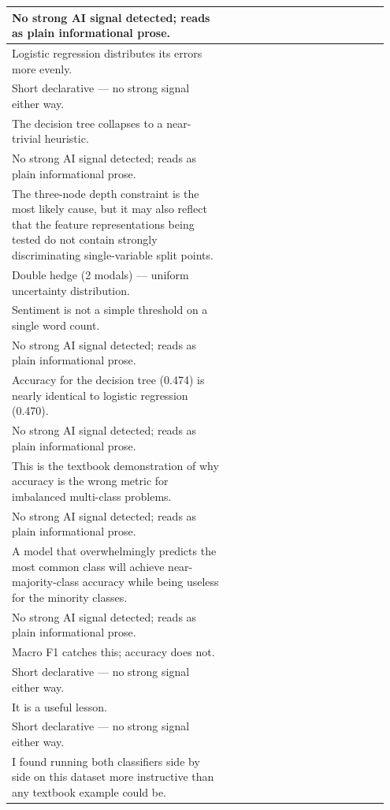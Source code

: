 \documentclass[11pt]{article}
\begin{document}
\begin{longtable}{|p{0.55\linewidth}|p{0.40\linewidth}|}
\hline
No strong AI signal detected; reads as plain informational prose. & \\
\hline
Logistic regression distributes its errors more evenly. & \\[2pt]
\hline
Short declarative --- no strong signal either way. & \\
\hline
The decision tree collapses to a near-trivial heuristic. & \\[2pt]
\hline
No strong AI signal detected; reads as plain informational prose. & \\
\hline
The three-node depth constraint is the most likely cause, but it may also reflect that the feature representations being tested do not contain strongly discriminating single-variable split points. & \\[2pt]
\hline
Double hedge (2 modals) --- uniform uncertainty distribution. & \\
\hline
Sentiment is not a simple threshold on a single word count. & \\[2pt]
\hline
No strong AI signal detected; reads as plain informational prose. & \\
\hline
Accuracy for the decision tree (0.474) is nearly identical to logistic regression (0.470). & \\[2pt]
\hline
No strong AI signal detected; reads as plain informational prose. & \\
\hline
This is the textbook demonstration of why accuracy is the wrong metric for imbalanced multi-class problems. & \\[2pt]
\hline
No strong AI signal detected; reads as plain informational prose. & \\
\hline
A model that overwhelmingly predicts the most common class will achieve near-majority-class accuracy while being useless for the minority classes. & \\[2pt]
\hline
No strong AI signal detected; reads as plain informational prose. & \\
\hline
Macro F1 catches this; accuracy does not. & \\[2pt]
\hline
Short declarative --- no strong signal either way. & \\
\hline
It is a useful lesson. & \\[2pt]
\hline
Short declarative --- no strong signal either way. & \\
\hline
I found running both classifiers side by side on this dataset more instructive than any textbook example could be. & \\[2pt]
\hline

\end{longtable}
\end{document}

